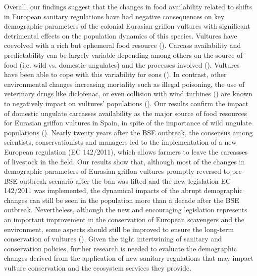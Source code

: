 \documentclass[12pt]{article}
\begin{document}
Overall, our findings suggest that the changes in food availability related to shifts in European sanitary regulations have had negative consequences on key demographic parameters of the colonial Eurasian griffon vultures with significant detrimental effects on the population dynamics of this species. Vultures have coevolved with a rich but ephemeral food resource (\cite{DeVault2003}). Carcass availability and predictability can be largely variable depending among others on the source of food (i.e. wild vs. domestic ungulates) and the processes involved (\cite{Moleon2014a}). Vultures have been able to cope with this variability for eons (\cite{Moleon2014}). In contrast, other environmental changes increasing mortality such as illegal poisoning, the use of veterinary drugs like diclofenac, or even collision with wind turbines (\cite{Martinez-Abrain2012,Margalida2021}) are known to negatively impact on vultures’ populations (\cite{Green2006a,Serrano2020}). Our results confirm the impact of domestic ungulate carcasses availability as the major source of food resources for Eurasian griffon vultures in Spain, in spite of the importance of wild ungulate populations (\cite{Mateo-Tomas2015,Blanco2019}). Nearly twenty years after the BSE outbreak, the consensus among scientists, conservationists and managers led to the implementation of a new European regulation (EC 142/2011), which allows farmers to leave the carcasses of livestock in the field. Our results show that, although most of the changes in demographic parameters of Eurasian griffon vultures promptly reversed to pre-BSE outbreak scenario after the ban was lifted and the new legislation EC 142/2011 was implemented, the dynamical impacts of the abrupt demographic changes can still be seen in the population more than a decade after the BSE outbreak. Nevertheless, although the new and encouraging legislation represents an important improvement in the conservation of European scavengers and the environment, some aspects should still be improved to ensure the long-term conservation of vultures (\cite{Mateo-Tomas2019,Morales-Reyes2017,Blanco2016,Blanco2019}). Given the tight intertwining of sanitary and conservation policies, further research is needed to evaluate the demographic changes derived from the application of new sanitary regulations that may impact vulture conservation and the ecosystem services they provide.
\end{document}
